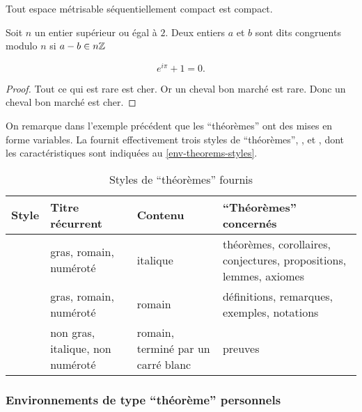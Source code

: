 \begin{bodycode}
\begin{theorem}
  Tout espace métrisable séquentiellement compact est compact.
\end{theorem}
\begin{definition}
  Soit $n$ un entier supérieur ou égal à $2$. Deux entiers $a$ et $b$
  sont dits congruents modulo $n$ si $a - b \in n\mathbb{Z}$
\end{definition}
\begin{remark*}
  \[
  e^{i\pi}+1=0.
  \]
\end{remark*}
\begin{proof}
  Tout ce qui est rare est cher. Or un cheval bon marché est rare.
  Donc un cheval bon marché est cher.
\end{proof}
\end{bodycode}

On remarque dans l'exemple précédent que les \enquote{théorèmes} ont des mises
en forme variables. La \nwejmauthorcl{} fournit effectivement trois styles de
\enquote{théorèmes}, ,  et
, dont les caractéristiques sont indiquées au
\vref{env-theorems-styles}.

\begin{table}
  \centering
  \begin{tabulary}{\linewidth}{LLLL}
Style                 & Titre récurrent                  & Contenu                            & \enquote{Théorèmes} concernés               \\\toprule
{}    & gras, romain, numéroté           & italique
                      & théorèmes, corollaires, conjectures, propositions, lemmes, axiomes                                                  \\\midrule
{} & gras, romain, numéroté           & romain                             & définitions, remarques, exemples, notations \\\midrule
{}      & non gras, italique, non numéroté & romain, terminé par un carré blanc & preuves                                     \\\bottomrule
  \end{tabulary}
  \caption{Styles de \enquote{théorèmes} fournis}
  \label{env-theorems-styles}
\end{table}

\subsubsection{Environnements de type \enquote{théorème} personnels}
\label{sec:envir-de-type-1}

